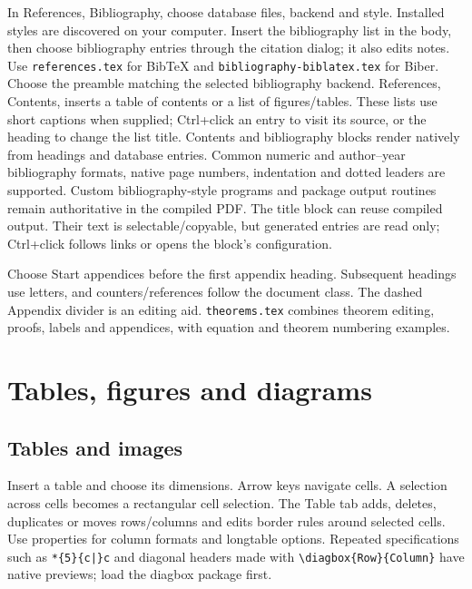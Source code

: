 \documentclass[11pt]{article}
\begin{document}
In References, Bibliography, choose database files, backend and style. Installed
styles are discovered on your computer. Insert the bibliography list in the body,
then choose bibliography entries through the citation dialog; it also edits notes.
Use \texttt{references.tex} for BibTeX and \texttt{bibliography-biblatex.tex} for Biber.
Choose the preamble matching the selected bibliography backend. References, Contents, inserts a table of
contents or a list of figures/tables. These lists use short captions when supplied;
Ctrl+click an entry to visit its source, or the heading to change the list title.
Contents and bibliography blocks render natively from headings and database entries. Common numeric and author--year bibliography formats, native page
numbers, indentation and dotted leaders are supported. Custom bibliography-style
programs and package output routines remain authoritative in the compiled PDF.
The title block can reuse compiled output. Their text is selectable/copyable, but generated
entries are read only; Ctrl+click follows links or opens the block's configuration.

Choose Start appendices before the first appendix heading. Subsequent headings
use letters, and counters/references follow the document class. The dashed
Appendix divider is an editing aid. \texttt{theorems.tex} combines theorem editing,
proofs, labels and appendices, with equation and theorem numbering examples.

\section{Tables, figures and diagrams}
\subsection{Tables and images}
Insert a table and choose its dimensions. Arrow keys navigate cells. A selection
across cells becomes a rectangular cell selection. The Table tab adds, deletes,
duplicates or moves rows/columns and edits border rules around selected cells.
Use properties for column formats and longtable options.
Repeated specifications such as \verb+*{5}{c|}c+ and diagonal headers made with
\verb|\diagbox{Row}{Column}| have native previews; load the diagbox package first.
\end{document}
